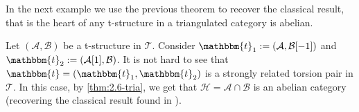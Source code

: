 In the next example we use the previous theorem to recover the classical result, that is the heart of any t-structure in a triangulated category is abelian.

\begin{example}
  \begin{sloppypar}
  Let $(\mathcal{A},\mathcal{B})$ be a t-structure in $\mathcal{T}$. Consider
  ${\mathbbm{t}_1:=(\mathcal{A},\mathcal{B}[-1])}$ and ${\mathbbm{t}_2 :=(\mathcal{A}[1],\mathcal{B})}$.
  It is not hard to see that ${\mathbbm{t}=(\mathbbm{t}_1,\mathbbm{t}_2)}$ is a strongly related
  torsion pair in $\mathcal{T}$. In this case, by \ref{thm:2.6-tria}, we get that $\mathcal{H}=\mathcal{A}\cap\mathcal{B}$
  is an abelian category (recovering the classical result found in \cite{bbd82}).
\end{sloppypar}
\end{example}

